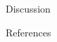 \documentclass[final,hyperref={pdfpagelabels=false},xcolor=table]{beamer}
\begin{document}
\begin{frame}[t]
\begin{columns}[t]
\begin{column}{.3\textwidth}
\begin{block}{Discussion}
    \end{block}
    \begin{block}{References}
      \linespread{0.928}\selectfont
      \footnotesize{
      }
    \end{block}

  \end{column} %
  \begin{column}{.02\textwidth}\end{column} %
\end{columns} %
\end{frame} %
\end{document}
